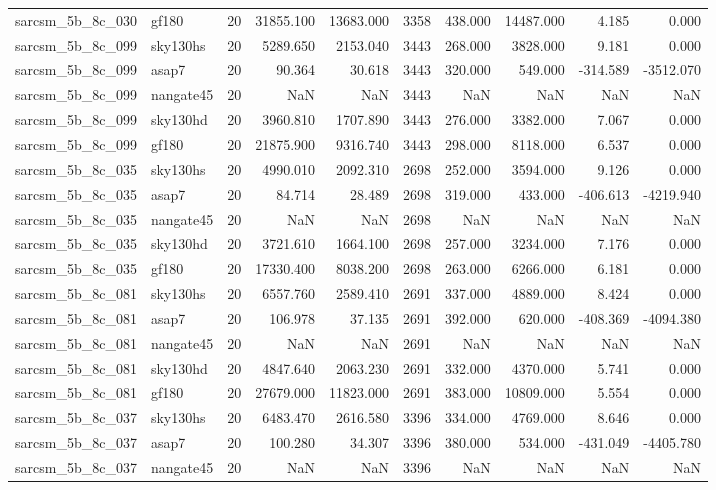 \begin{tabular}{llrrrrrrrr}
sarcsm\_5b\_8c\_030 & gf180 & 20 & 31855.100 & 13683.000 & 3358 & 438.000 & 14487.000 & 4.185 & 0.000 \\
sarcsm\_5b\_8c\_099 & sky130hs & 20 & 5289.650 & 2153.040 & 3443 & 268.000 & 3828.000 & 9.181 & 0.000 \\
sarcsm\_5b\_8c\_099 & asap7 & 20 & 90.364 & 30.618 & 3443 & 320.000 & 549.000 & -314.589 & -3512.070 \\
sarcsm\_5b\_8c\_099 & nangate45 & 20 & NaN & NaN & 3443 & NaN & NaN & NaN & NaN \\
sarcsm\_5b\_8c\_099 & sky130hd & 20 & 3960.810 & 1707.890 & 3443 & 276.000 & 3382.000 & 7.067 & 0.000 \\
sarcsm\_5b\_8c\_099 & gf180 & 20 & 21875.900 & 9316.740 & 3443 & 298.000 & 8118.000 & 6.537 & 0.000 \\
sarcsm\_5b\_8c\_035 & sky130hs & 20 & 4990.010 & 2092.310 & 2698 & 252.000 & 3594.000 & 9.126 & 0.000 \\
sarcsm\_5b\_8c\_035 & asap7 & 20 & 84.714 & 28.489 & 2698 & 319.000 & 433.000 & -406.613 & -4219.940 \\
sarcsm\_5b\_8c\_035 & nangate45 & 20 & NaN & NaN & 2698 & NaN & NaN & NaN & NaN \\
sarcsm\_5b\_8c\_035 & sky130hd & 20 & 3721.610 & 1664.100 & 2698 & 257.000 & 3234.000 & 7.176 & 0.000 \\
sarcsm\_5b\_8c\_035 & gf180 & 20 & 17330.400 & 8038.200 & 2698 & 263.000 & 6266.000 & 6.181 & 0.000 \\
sarcsm\_5b\_8c\_081 & sky130hs & 20 & 6557.760 & 2589.410 & 2691 & 337.000 & 4889.000 & 8.424 & 0.000 \\
sarcsm\_5b\_8c\_081 & asap7 & 20 & 106.978 & 37.135 & 2691 & 392.000 & 620.000 & -408.369 & -4094.380 \\
sarcsm\_5b\_8c\_081 & nangate45 & 20 & NaN & NaN & 2691 & NaN & NaN & NaN & NaN \\
sarcsm\_5b\_8c\_081 & sky130hd & 20 & 4847.640 & 2063.230 & 2691 & 332.000 & 4370.000 & 5.741 & 0.000 \\
sarcsm\_5b\_8c\_081 & gf180 & 20 & 27679.000 & 11823.000 & 2691 & 383.000 & 10809.000 & 5.554 & 0.000 \\
sarcsm\_5b\_8c\_037 & sky130hs & 20 & 6483.470 & 2616.580 & 3396 & 334.000 & 4769.000 & 8.646 & 0.000 \\
sarcsm\_5b\_8c\_037 & asap7 & 20 & 100.280 & 34.307 & 3396 & 380.000 & 534.000 & -431.049 & -4405.780 \\
sarcsm\_5b\_8c\_037 & nangate45 & 20 & NaN & NaN & 3396 & NaN & NaN & NaN & NaN \\

\end{tabular}
